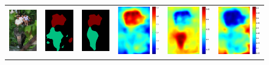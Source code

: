 \documentclass[10pt,twocolumn,letterpaper]{article}
\begin{document}
\begin{figure}
\begin{tabular}{c c c c c c}
   \includegraphics[height=0.14\linewidth]{fig/coco/img/COCO_val2014_000000000974.jpg} &
   \includegraphics[height=0.14\linewidth]{fig/coco/res_baseline/COCO_val2014_000000000974.png} &
   \includegraphics[height=0.14\linewidth]{fig/coco/res_sharenet/COCO_val2014_000000000974.png} &
   \includegraphics[height=0.14\linewidth]{fig/coco/att1/COCO_val2014_000000000974.pdf} &
   \includegraphics[height=0.14\linewidth]{fig/coco/att2/COCO_val2014_000000000974.pdf} &
   \includegraphics[height=0.14\linewidth]{fig/coco/att3/COCO_val2014_000000000974.pdf} \\

\end{tabular}
\end{figure}
\end{document}
